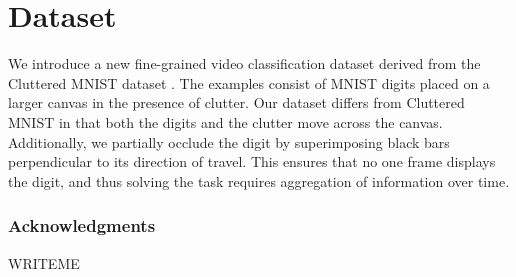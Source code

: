 \documentclass{article} %
\begin{document}
\section{Dataset}

We introduce a new fine-grained video classification dataset derived from the Cluttered MNIST dataset \cite{clutteredmnist}.
The examples consist of MNIST digits placed on a larger canvas in the presence of clutter.
Our dataset differs from Cluttered MNIST in that both the digits and the clutter move across the canvas.
Additionally, we partially occlude the digit by superimposing black bars perpendicular to its direction of travel.
This ensures that no one frame displays the digit, and thus solving the task requires aggregation of information over time.

\subsubsection*{Acknowledgments}

WRITEME



\end{document}
